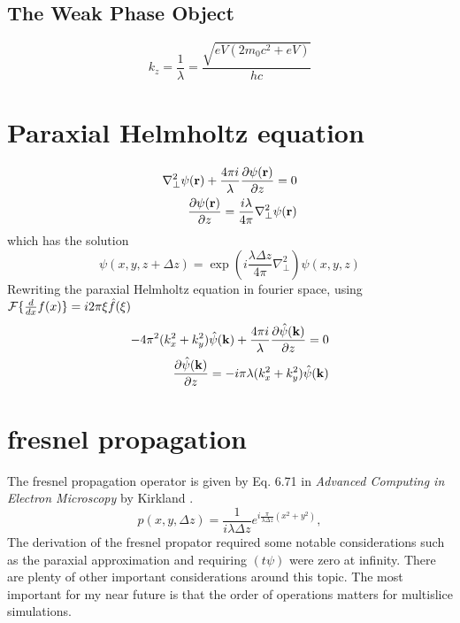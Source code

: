 \documentclass[12pt]{article}
\providecommand{\FT}[1]{\ensuremath{\mathcal{F}\{#1\}}}   %
\begin{document}
\subsection{The Weak Phase Object}
\begin{equation}
    k_z = \frac{1}{\lambda} = \frac{\sqrt{eV(2m_0c^2 + eV)}}{hc}
\end{equation}



\section{Paraxial Helmholtz equation}
\begin{align*}
    \nabla_\perp^2 \psi(\mathbf{r}) + \frac{4\pi i}{\lambda} \pdv{\psi(\mathbf{r})}{z} = 0\\
    \pdv{\psi(\mathbf{r})}{z} = \frac{i\lambda}{4\pi} \nabla_\perp^2 \psi(\mathbf{r})
\end{align*}
which has the solution
\begin{equation*}
    \psi(x,y,z+\Delta z) = \exp(i \frac{\lambda \Delta z}{4\pi} \nabla_\perp^2) \psi(x,y,z)
\end{equation*}
Rewriting the paraxial Helmholtz equation in fourier space, using $\FT{\dv{x} f(x)} = i2\pi \xi \hat{f}(\xi)$ 
\begin{align*}
    -4\pi^2 (k_x^2 + k_y^2) \hat{\psi}(\mathbf{k}) + \frac{4\pi i}{\lambda} \pdv{\hat{\psi}(\mathbf{k})}{z} = 0\\
    \pdv{\hat{\psi}(\mathbf{k})}{z} = -i \pi \lambda (k_x^2 + k_y^2) \hat{\psi}(\mathbf{k})
\end{align*}

\section{fresnel propagation}

The fresnel propagation operator is given by Eq. 6.71 in 
\textit{Advanced Computing in Electron Microscopy} by Kirkland \cite{Kirkland2010}.
\begin{equation}\label{eq:fresnel_propagator}
    p(x,y, \Delta z) = \frac{1}{i\lambda \Delta z} e^{i \frac{\pi}{\lambda \Delta z} (x^2 + y^2)},
\end{equation}
The derivation of the fresnel propator required some notable considerations 
such as the paraxial approximation and requiring $(t \psi)$ were zero at infinity. There 
are plenty of other important considerations around this topic. The most important for 
my near future is that the order of operations matters for multislice simulations.
\end{document}
